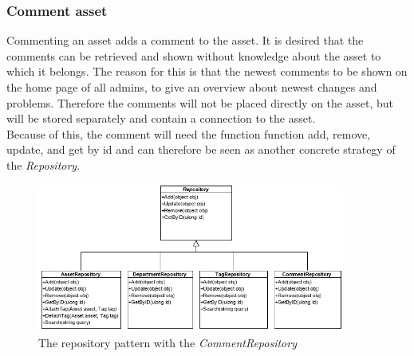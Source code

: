 \subsubsection{Comment asset}
Commenting an asset adds a comment to the asset. It is desired that the comments can be retrieved and shown without knowledge about the asset to which it belongs. The reason for this is that the newest comments to be shown on the home page of all admins, to give an overview about newest changes and problems. Therefore the comments will not be placed directly on the asset, but will be stored separately and contain a connection to the asset.\\
Because of this, the comment will need the function function add, remove, update, and get by id and can therefore be seen as another concrete strategy of the \textit{Repository}.
\begin{figure}[H]
    \centering
    \includegraphics[width=0.9\textwidth]{figures/FunctionComponent/CommentRepository.png}
    \caption{The repository pattern with the \textit{CommentRepository}}
    \label{fig:RepositoryPatternWithCommentRepository}
\end{figure}


